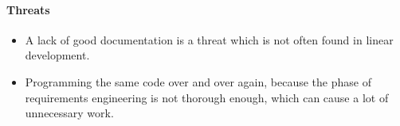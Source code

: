 \paragraph{Threats} 
\begin{itemize}
        \item A lack of good documentation is a threat which is not often found in linear development.
        \item Programming the same code over and over again, because the phase of requirements engineering is not thorough enough, which can cause a lot of unnecessary work.
\end{itemize}   
\setlist{}